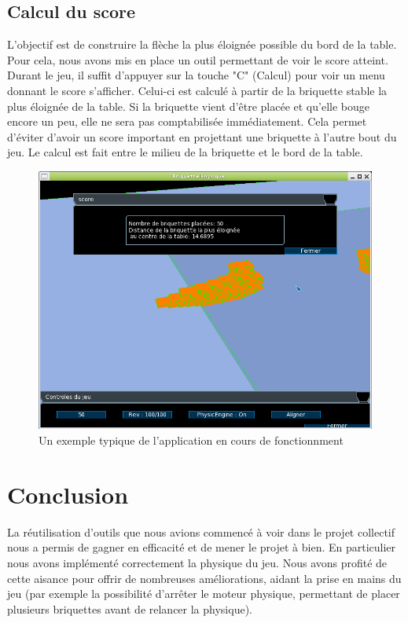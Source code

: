 \documentclass[frenchb,twoside]{EPURapport}
\begin{document}
    \section{Calcul du score}
        L'objectif est de construire la flèche la plus éloignée possible du bord
        de la table. Pour cela, nous avons mis en place un outil permettant de
        voir le score atteint. Durant le jeu, il suffit d'appuyer sur la touche
        "C" (Calcul) pour voir un menu donnant le score s'afficher.
        Celui-ci est calculé à partir de la briquette stable la plus éloignée
        de la table. Si la briquette vient d'être placée et qu'elle bouge encore
        un peu, elle ne sera pas comptabilisée immédiatement. Cela permet
        d'éviter d'avoir un score important en projettant une briquette à
        l'autre bout du jeu. Le calcul est fait entre le milieu de la briquette
        et le bord de la table.
    \begin{figure}[h]
		\centering
        \includegraphics[width=13cm]{images/score.png}
        \caption{\label{fig:jeux}Un exemple typique de l'application en cours de fonctionnment}
    \end{figure}
        
\chapter{Conclusion}
    La réutilisation d'outils que nous avions commencé à voir dans le projet
    collectif nous a permis de gagner en efficacité et de mener
    le projet à bien. En particulier nous avons implémenté correctement la
    physique du jeu. Nous avons profité de cette aisance pour offrir de
    nombreuses améliorations, aidant la prise en mains du jeu (par exemple la
    possibilité d'arrêter le moteur physique, permettant de placer plusieurs
    briquettes avant de relancer la physique).
    
\end{document}
